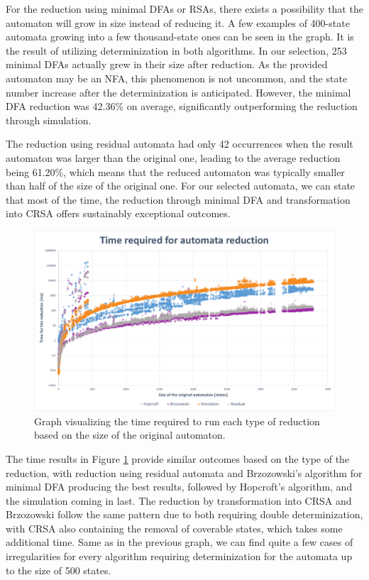 For the reduction using minimal DFAs or RSAs, there exists a possibility that the automaton will grow in size instead of reducing it. A few examples of 400-state automata growing into a few thousand-state ones can be seen in the graph. It is the result of utilizing determinization in both algorithms. In our selection, 253 minimal DFAs actually grew in their size after reduction. As the provided automaton may be an NFA, this phenomenon is not uncommon, and the state number increase after the determinization is anticipated. However, the minimal DFA reduction was 42.36\% on average, significantly outperforming the reduction through simulation.

The reduction using residual automata had only 42 occurrences when the result automaton was larger than the original one, leading to the average reduction being 61.20\%, which means that the reduced automaton was typically smaller than half of the size of the original one. For our selected automata, we can state that most of the time, the reduction through minimal DFA and transformation into CRSA offers sustainably exceptional outcomes.



\begin{figure}[ht]
    \label{fig:graph_time}
    \centering
    \includegraphics[width=1\linewidth]{obrazky-figures/time.pdf}
    \caption{Graph visualizing the time required to run each type of reduction based on the size of the original automaton.}
\end{figure}
\vspace{0.3cm}

The time results in Figure \ref{fig:graph_time} provide similar outcomes based on the type of the reduction, with reduction using residual automata and Brzozowski's algorithm for minimal DFA producing the best results, followed by Hopcroft's algorithm, and the simulation coming in last. The reduction by transformation into CRSA and Brzozowski follow the same pattern due to both requiring double determinization, with CRSA also containing the removal of coverable states, which takes some additional time. Same as in the previous graph, we can find quite a few cases of irregularities for every algorithm requiring determinization for the automata up to the size of 500 states.

